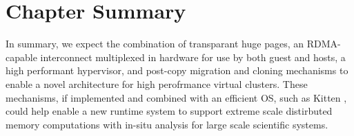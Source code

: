 \section{Chapter Summary}
\label{chap7sum}



In summary, we expect the combination of transparant huge pages, an RDMA-capable interconnect multiplexed in hardware for use by both guest and hosts, a high performant hypervisor, and post-copy migration and cloning mechanisms to enable a novel architecture for high perofrmance virtual clusters. These mechanisms, if implemented and combined with an efficient OS, such as Kitten \cite{pedretti2011kitten}, could help enable a new runtime system to support extreme scale distirbuted memory computations with in-situ analysis \cite{ahrens2010visualization, vishwanath2011toward} for large scale scientific systems. 




